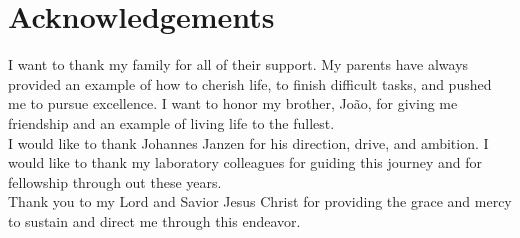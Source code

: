 \chapter*{Acknowledgements}
I want to thank my family for all of their support. My parents have always
provided an example of how to cherish life, to finish difficult tasks, and pushed me to pursue excellence. I want to honor my brother, João, for giving me friendship and an example of living life to the fullest.\\
I would like to thank Johannes Janzen for his direction, drive, and ambition. I would like to thank my laboratory colleagues for guiding this journey and for fellowship through out these years.\\
Thank you to my Lord and Savior Jesus Christ for providing the grace and mercy
to sustain and direct me through this endeavor.